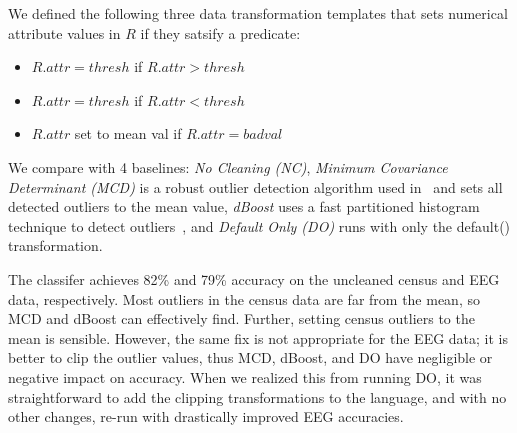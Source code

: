 


We defined the following three data transformation templates that sets numerical attribute values in $R$ if they satsify a predicate:

{\small
\begin{itemize}[leftmargin=*, topsep=0mm, itemsep=0mm]
  \item {} $R.attr = thresh$ if $R.attr>thresh$
  \item {} $R.attr = thresh$ if $R.attr<thresh$
  \item {} $R.attr$ set to mean val if $R.attr=badval$
\end{itemize}
}

 We compare with 4 baselines: {\it No Cleaning (NC)}, {\it Minimum Covariance Determinant (MCD)} is a robust outlier detection algorithm used in~\cite{bailis2016macrobase} and sets all detected outliers to the mean value, {\it dBoost} uses a fast partitioned histogram technique to detect outliers~\cite{mariet2016outlier}, and {\it Default Only (DO)} runs \sys with only the \textsf{default()} transformation.  

 The classifer achieves 82\% and 79\% accuracy on the uncleaned census and EEG data, respectively.  Most outliers in the census data are far from the mean, so MCD and dBoost can effectively find.  Further, setting census outliers to the mean is sensible. However, the same fix is not appropriate for the EEG data; it is better to clip the outlier values, thus MCD, dBoost, and DO have negligible or negative impact on accuracy.  When we realized this from running DO, it was straightforward to add the clipping transformations to the language, and with no other changes, re-run \sys with drastically improved EEG accuracies.  

